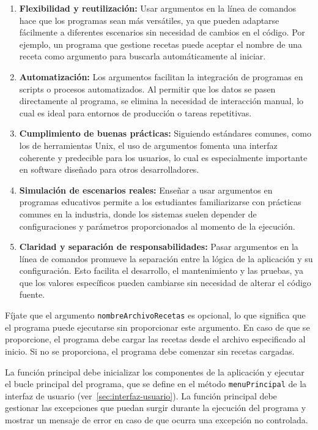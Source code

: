 \documentclass[
    a4paper, %
    12pt, %
]{CSSullivanBusinessReport}
\begin{document}
\begin{enumerate}
    \item \textbf{Flexibilidad y reutilización:}  
    Usar argumentos en la línea de comandos hace que los programas sean más versátiles, ya que pueden adaptarse fácilmente a diferentes escenarios sin necesidad de cambios en el código. Por ejemplo, un programa que gestione recetas puede aceptar el nombre de una receta como argumento para buscarla automáticamente al iniciar.

    \item \textbf{Automatización:}  
    Los argumentos facilitan la integración de programas en scripts o procesos automatizados. Al permitir que los datos se pasen directamente al programa, se elimina la necesidad de interacción manual, lo cual es ideal para entornos de producción o tareas repetitivas.

    \item \textbf{Cumplimiento de buenas prácticas:}  
    Siguiendo estándares comunes, como los de herramientas Unix, el uso de argumentos fomenta una interfaz coherente y predecible para los usuarios, lo cual es especialmente importante en software diseñado para otros desarrolladores.

    \item \textbf{Simulación de escenarios reales:}  
    Enseñar a usar argumentos en programas educativos permite a los estudiantes familiarizarse con prácticas comunes en la industria, donde los sistemas suelen depender de configuraciones y parámetros proporcionados al momento de la ejecución.

    \item \textbf{Claridad y separación de responsabilidades:}  
    Pasar argumentos en la línea de comandos promueve la separación entre la lógica de la aplicación y su configuración. Esto facilita el desarrollo, el mantenimiento y las pruebas, ya que los valores específicos pueden cambiarse sin necesidad de alterar el código fuente.
\end{enumerate}

Fíjate que el argumento \texttt{nombreArchivoRecetas} es opcional, lo que significa que el programa puede ejecutarse sin proporcionar este argumento. En caso de que se proporcione, el programa debe cargar las recetas desde el archivo especificado al inicio. Si no se proporciona, el programa debe comenzar sin recetas cargadas.

La función principal debe inicializar los componentes de la aplicación y ejecutar el bucle principal del programa, que se define en el método \texttt{menuPrincipal} de la interfaz de usuario (ver~\cref{sec:interfaz-usuario}). La función principal debe gestionar las excepciones que puedan surgir durante la ejecución del programa y mostrar un mensaje de error en caso de que ocurra una excepción no controlada.
\end{document}
